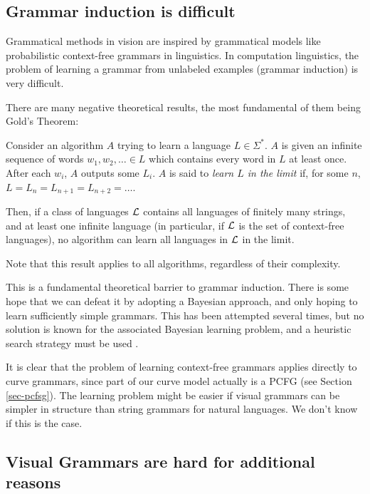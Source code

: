 \documentclass{article}
\begin{document}
\subsection{Grammar induction is difficult}
\label{sec-gram-hard}

Grammatical methods in vision are inspired by grammatical models like
probabilistic context-free grammars in linguistics. In computation
linguistics, the problem of learning a grammar from unlabeled examples
(grammar induction) is very difficult.

There are many \cite{lee-induction} negative theoretical results, the
most fundamental of them being Gold's Theorem:

\begin{thm}
Consider an algorithm $A$ trying to learn a language $L\in \Sigma^*$.
$A$ is given an infinite sequence of words $w_1, w_2, \dots\in L$ which
contains every word in $L$ at least once. After each $w_i$, $A$
outputs some $L_i$. $A$ is said to {\em learn $L$ in the limit} if,
for some $n$, $L = L_n = L_{n+1} = L_{n+2} = \dots$.

Then, if a class of languages ${\mathcal L}$ contains all languages of
finitely many strings, and at least one infinite language (in
particular, if ${\mathcal L}$ is the set of context-free languages), no
algorithm can learn all languages in ${\mathcal L}$ in the limit.
\end{thm}
Note that this result applies to all algorithms, regardless of their
complexity. 

This is a fundamental theoretical barrier to grammar induction. There
is some hope that we can defeat it by adopting a Bayesian approach,
and only hoping to learn sufficiently simple grammars. This has been
attempted several times, but no solution is known for the associated
Bayesian learning problem, and a heuristic search strategy must be
used \cite{cook, stolcke, nevill-manning}.

It is clear that the problem of learning context-free grammars applies
directly to curve grammars, since part of our curve model actually is
a PCFG (see Section \ref{sec-pcfsg}). The learning problem might be
easier if visual grammars can be simpler in structure than string
grammars for natural languages. We don't know if this is the case.

\subsection{Visual Grammars are hard for additional reasons}
\end{document}
